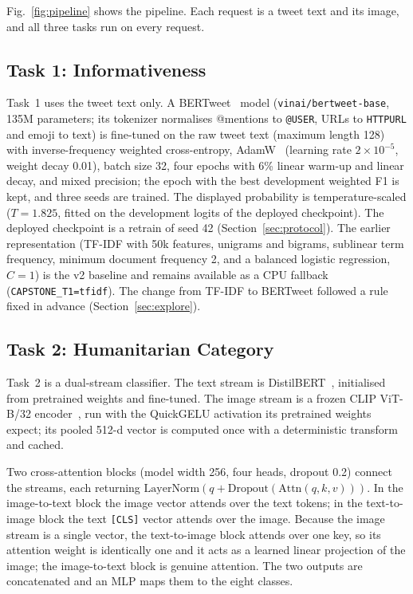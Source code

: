 \documentclass[conference]{IEEEtran}
\begin{document}
Fig.~\ref{fig:pipeline} shows the pipeline. Each request is a tweet text and its image, and all three tasks run on every request.

\subsection{Task 1: Informativeness}
Task~1 uses the tweet text only. A BERTweet~\cite{nguyen2020} model (\texttt{vinai/bertweet-base}, 135M parameters; its tokenizer normalises @mentions to \texttt{@USER}, URLs to \texttt{HTTPURL} and emoji to text) is fine-tuned on the raw tweet text (maximum length 128) with inverse-frequency weighted cross-entropy, AdamW~\cite{loshchilov2019} (learning rate $2\times10^{-5}$, weight decay 0.01), batch size 32, four epochs with 6\% linear warm-up and linear decay, and mixed precision; the epoch with the best development weighted F1 is kept, and three seeds are trained. The displayed probability is temperature-scaled ($T=1.825$, fitted on the development logits of the deployed checkpoint). The deployed checkpoint is a retrain of seed 42 (Section~\ref{sec:protocol}). The earlier representation (TF-IDF with 50k features, unigrams and bigrams, sublinear term frequency, minimum document frequency 2, and a balanced logistic regression, $C=1$) is the v2 baseline and remains available as a CPU fallback (\texttt{CAPSTONE\_T1=tfidf}). The change from TF-IDF to BERTweet followed a rule fixed in advance (Section~\ref{sec:explore}).

\subsection{Task 2: Humanitarian Category}
Task~2 is a dual-stream classifier. The text stream is DistilBERT~\cite{sanh2019}, initialised from pretrained weights and fine-tuned. The image stream is a frozen CLIP ViT-B/32 encoder~\cite{radford2021}, run with the QuickGELU activation its pretrained weights expect; its pooled 512-d vector is computed once with a deterministic transform and cached.

Two cross-attention blocks (model width 256, four heads, dropout 0.2) connect the streams, each returning $\mathrm{LayerNorm}(q + \mathrm{Dropout}(\mathrm{Attn}(q,k,v)))$. In the image-to-text block the image vector attends over the text tokens; in the text-to-image block the text \texttt{[CLS]} vector attends over the image. Because the image stream is a single vector, the text-to-image block attends over one key, so its attention weight is identically one and it acts as a learned linear projection of the image; the image-to-text block is genuine attention. The two outputs are concatenated and an MLP maps them to the eight classes.
\end{document}
